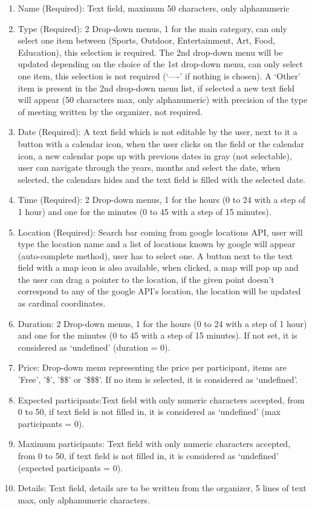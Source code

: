 \documentclass[conference]{IEEEtran}
\begin{document}
\begin{enumerate}
    \item Name (Required): Text field, maximum 50 characters, only alphanumeric
    \item Type (Required): 2 Drop-down menus, 1 for the main category, can only select one item between (Sports, Outdoor, Entertainment, Art, Food, Education), this selection is required. 
    The 2nd drop-down menu will be updated depending on the choice of the 1st drop-down menu, can only select one item, this selection is not required (‘----’ if nothing is chosen). 
    A ‘Other’ item is present in the 2nd drop-down menu list, if selected a new text field will appear (50 characters max, only alphanumeric) with precision of the type of meeting written by the organizer, not required.
    \item Date (Required): A text field which is not editable by the user, next to it a button with a calendar icon, when the user clicks on the field or the calendar icon, a new calendar pops up with previous dates in gray (not selectable), user can navigate through the years, months and select the date, when selected, the calendars hides and the text field is filled with the selected date.
    \item Time (Required): 2 Drop-down menus, 1 for the hours (0 to 24 with a step of 1 hour) and one for the minutes (0 to 45 with a step of 15 minutes).
    \item Location (Required): Search bar coming from google locations API, user will type the location name and a list of locations known by google will appear (auto-complete method), user has to select one.
    A button next to the text field with a map icon is also available, when clicked, a map will pop up and the user can drag a pointer to the location, if the given point doesn’t correspond to any of the google API’s location, the location will be updated as cardinal coordinates.
    \item Duration: 2 Drop-down menus, 1 for the hours (0 to 24 with a step of 1 hour) and one for the minutes (0 to 45 with a step of 15 minutes). 
    If not set, it is considered as ‘undefined’ (duration = 0).
    \item Price: Drop-down menu representing the price per participant, items are 'Free', '\$', '\$\$' or '\$\$\$'. 
    If no item is selected, it is considered as ‘undefined’.
    \item Expected participants:Text field with only numeric characters accepted, from 0 to 50, if text field is not filled in, it is considered as ‘undefined’ (max participants = 0).
    \item Maximum participants: Text field with only numeric characters accepted, from 0 to 50, if text field is not filled in, it is considered as ‘undefined’ (expected participants = 0).
    \item Details: Text field, details are to be written from the organizer, 5 lines of text max, only alphanumeric characters.
\end{enumerate}
\end{document}
